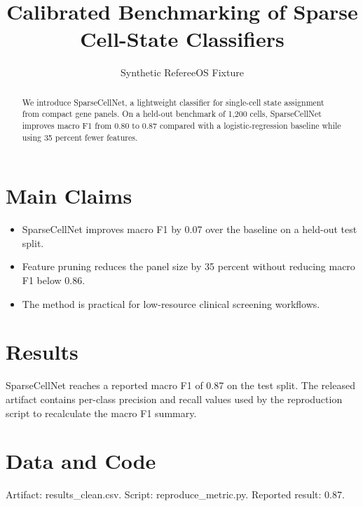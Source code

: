 \documentclass{article}
\title{Calibrated Benchmarking of Sparse Cell-State Classifiers}
\author{Synthetic RefereeOS Fixture}
\begin{document}
\maketitle

\begin{abstract}
We introduce SparseCellNet, a lightweight classifier for single-cell state assignment from compact gene panels. On a held-out benchmark of 1,200 cells, SparseCellNet improves macro F1 from 0.80 to 0.87 compared with a logistic-regression baseline while using 35 percent fewer features.
\end{abstract}

\section{Main Claims}
\begin{itemize}
\item SparseCellNet improves macro F1 by 0.07 over the baseline on a held-out test split.
\item Feature pruning reduces the panel size by 35 percent without reducing macro F1 below 0.86.
\item The method is practical for low-resource clinical screening workflows.
\end{itemize}



\section{Results}
SparseCellNet reaches a reported macro F1 of 0.87 on the test split. The released artifact contains per-class precision and recall values used by the reproduction script to recalculate the macro F1 summary.

\section{Data and Code}
Artifact: results_clean.csv.
Script: reproduce_metric.py.
Reported result: 0.87.



\end{document}
